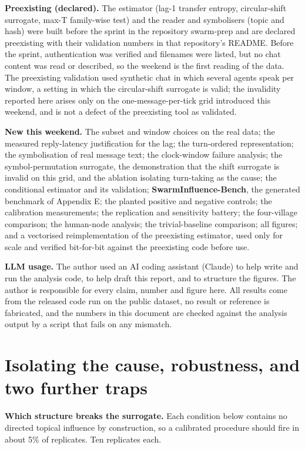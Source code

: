 \documentclass[11pt]{article}
\begin{document}
\textbf{Preexisting (declared).} The estimator (lag-1 transfer entropy, circular-shift surrogate, max-T family-wise test) and the reader and symbolisers (topic and hash) were built before the sprint in the repository swarm-prep and are declared preexisting with their validation numbers in that repository's README. Before the sprint, authentication was verified and filenames were listed, but no chat content was read or described, so the weekend is the first reading of the data. The preexisting validation used synthetic chat in which several agents speak per window, a setting in which the circular-shift surrogate is valid; the invalidity reported here arises only on the one-message-per-tick grid introduced this weekend, and is not a defect of the preexisting tool as validated.

\textbf{New this weekend.} The subset and window choices on the real data; the measured reply-latency justification for the lag; the turn-ordered representation; the symbolisation of real message text; the clock-window failure analysis; the symbol-permutation surrogate, the demonstration that the shift surrogate is invalid on this grid, and the ablation isolating turn-taking as the cause; the conditional estimator and its validation; \textbf{SwarmInfluence-Bench}, the generated benchmark of Appendix E; the planted positive and negative controls; the calibration measurements; the replication and sensitivity battery; the four-village comparison; the human-node analysis; the trivial-baseline comparison; all figures; and a vectorised reimplementation of the preexisting estimator, used only for scale and verified bit-for-bit against the preexisting code before use.

\textbf{LLM usage.} The author used an AI coding assistant (Claude) to help write and run the analysis code, to help draft this report, and to structure the figures. The author is responsible for every claim, number and figure here. All results come from the released code run on the public dataset, no result or reference is fabricated, and the numbers in this document are checked against the analysis output by a script that fails on any mismatch.

\section{Isolating the cause, robustness, and two further traps}

\textbf{Which structure breaks the surrogate.} Each condition below contains no directed topical influence by construction, so a calibrated procedure should fire in about 5\% of replicates. Ten replicates each.
\end{document}
